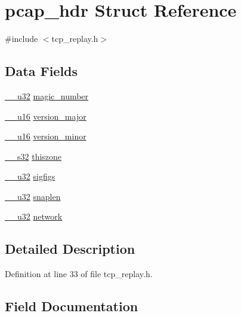 \hypertarget{structpcap__hdr}{}\section{pcap\+\_\+hdr Struct Reference}
\label{structpcap__hdr}


{\ttfamily \#include $<$tcp\+\_\+replay.\+h$>$}

\subsection*{Data Fields}
\begin{DoxyCompactItemize}
\item 
\hyperlink{asm__types_8h_a3acae9310e2c2e411e800a8a369171c6}{\+\_\+\+\_\+u32} \hyperlink{structpcap__hdr_a84de56e36631da9add3dee48780126a4}{magic\+\_\+number}
\item 
\hyperlink{asm__types_8h_abc70358187152575fd05fbf6d253151f}{\+\_\+\+\_\+u16} \hyperlink{structpcap__hdr_aac1babfd335ddcb87664b00b3fc3044c}{version\+\_\+major}
\item 
\hyperlink{asm__types_8h_abc70358187152575fd05fbf6d253151f}{\+\_\+\+\_\+u16} \hyperlink{structpcap__hdr_a8cc4f2fea7a1ee09b4ef19cc89feceb2}{version\+\_\+minor}
\item 
\hyperlink{asm__types_8h_a375730bf3d49b04b76cd45693a00e5d5}{\+\_\+\+\_\+s32} \hyperlink{structpcap__hdr_a7e1a9866c3b96fa9e80047791b156da5}{thiszone}
\item 
\hyperlink{asm__types_8h_a3acae9310e2c2e411e800a8a369171c6}{\+\_\+\+\_\+u32} \hyperlink{structpcap__hdr_a981136e35d46d41c5ae12d3783aebc92}{sigfigs}
\item 
\hyperlink{asm__types_8h_a3acae9310e2c2e411e800a8a369171c6}{\+\_\+\+\_\+u32} \hyperlink{structpcap__hdr_a9cc0121b72d0130a1f05388026a15213}{snaplen}
\item 
\hyperlink{asm__types_8h_a3acae9310e2c2e411e800a8a369171c6}{\+\_\+\+\_\+u32} \hyperlink{structpcap__hdr_ad2db71f5c9eda2cbdec7bb905865c79e}{network}
\end{DoxyCompactItemize}


\subsection{Detailed Description}


Definition at line 33 of file tcp\+\_\+replay.\+h.



\subsection{Field Documentation}
\mbox{\label{structpcap__hdr_a84de56e36631da9add3dee48780126a4}} 
